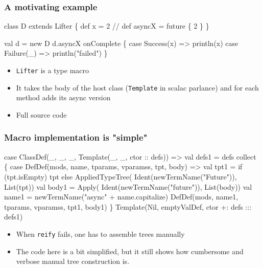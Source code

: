 \documentclass[svgnames,hyperref={bookmarks=false}]{beamer}
\begin{document}
\begin{frame}[fragile]
\frametitle{A motivating example}

\begin{semiverbatim}
class D extends Lifter \{
  def x = 2
  // def asyncX = future \{ 2 \}
\}

val d = new D
d.asyncX onComplete \{
  case Success(x) => println(x)
  case Failure(_) => println("failed")
\}
\end{semiverbatim}

\begin{itemize}
\item \texttt{Lifter} is a type macro
\item It takes the body of the host class (\texttt{Template} in scalac parlance) and for each method adds its async version
\item Full source code 
\end{itemize}
\end{frame}

\begin{frame}[fragile]
\frametitle{Macro implementation is "simple"}

\begin{semiverbatim}
case ClassDef(_, _, _, Template(_, _, ctor :: defs)) =>
  val defs1 = defs collect \{
    case DefDef(mods, name, tparams, vparamss, tpt, body) =>
      val tpt1 = if (tpt.isEmpty) tpt else AppliedTypeTree(
        Ident(newTermName("Future")), List(tpt))
      val body1 = Apply(
        Ident(newTermName("future")), List(body))
      val name1 = newTermName("async" + name.capitalize)
      DefDef(mods, name1, tparams, vparamss, tpt1, body1)
  \}
  Template(Nil, emptyValDef, ctor +: defs ::: defs1)
\end{semiverbatim}

\begin{itemize}
\item When \texttt{reify} fails, one has to assemble trees manually
\item The code here is a bit simplified, but it still shows how cumbersome and verbose manual tree construction is.
\end{itemize}
\end{frame}
\end{document}
